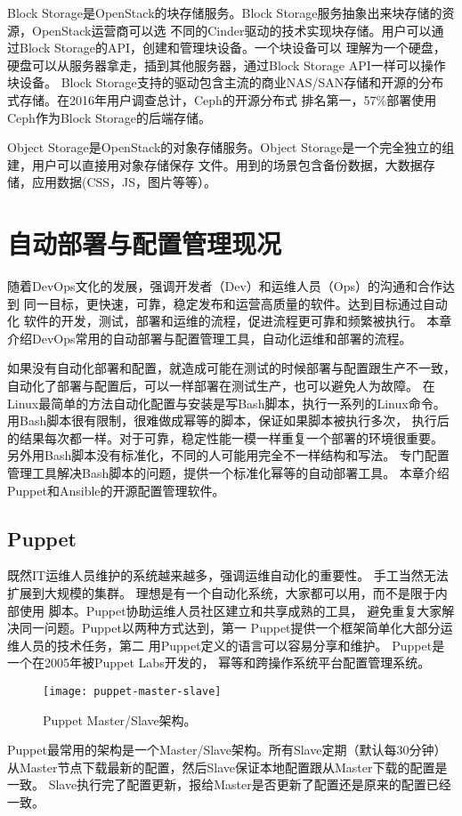Block Storage是OpenStack的块存储服务。Block Storage服务抽象出来块存储的资源，OpenStack运营商可以选
不同的Cinder驱动的技术实现块存储。用户可以通过Block Storage的API，创建和管理块设备。一个块设备可以
理解为一个硬盘，硬盘可以从服务器拿走，插到其他服务器，通过Block Storage API一样可以操作块设备。
Block Storage支持的驱动包含主流的商业NAS/SAN存储和开源的分布式存储。在2016年用户调查总计，Ceph的开源分布式
排名第一，57\%部署使用Ceph作为Block Storage的后端存储。

Object Storage是OpenStack的对象存储服务。Object Storage是一个完全独立的组建，用户可以直接用对象存储保存
文件。用到的场景包含备份数据，大数据存储，应用数据(CSS，JS，图片等等）。



\section{自动部署与配置管理现况}
\label{subsec:automated_deployment}
随着DevOps文化的发展，强调开发者（Dev）和运维人员（Ops）的沟通和合作达到
同一目标，更快速，可靠，稳定发布和运营高质量的软件。达到目标通过自动化
软件的开发，测试，部署和运维的流程，促进流程更可靠和频繁被执行。
本章介绍DevOps常用的自动部署与配置管理工具，自动化运维和部署的流程。

如果没有自动化部署和配置，就造成可能在测试的时候部署与配置跟生产不一致，
自动化了部署与配置后，可以一样部署在测试生产，也可以避免人为故障。
在Linux最简单的方法自动化配置与安装是写Bash脚本，执行一系列的Linux命令。
用Bash脚本很有限制，很难做成幂等的脚本，保证如果脚本被执行多次，
执行后的结果每次都一样。对于可靠，稳定性能一模一样重复一个部署的环境很重要。
另外用Bash脚本没有标准化，不同的人可能用完全不一样结构和写法。
专门配置管理工具解决Bash脚本的问题，提供一个标准化幂等的自动部署工具。
本章介绍Puppet和Ansible的开源配置管理软件。


\subsection{Puppet}
既然IT运维人员维护的系统越来越多，强调运维自动化的重要性。
手工当然无法扩展到大规模的集群。
理想是有一个自动化系统，大家都可以用，而不是限于内部使用
脚本。Puppet协助运维人员社区建立和共享成熟的工具，
避免重复大家解决同一问题。Puppet以两种方式达到，第一
Puppet提供一个框架简单化大部分运维人员的技术任务，第二
用Puppet定义的语言可以容易分享和维护。
Puppet是一个在2005年被Puppet Labs开发的，
幂等和跨操作系统平台配置管理系统。\cite{puppet_docs}

\begin{wrapfigure}{r}{0.40\textwidth}
  \centering
    \texttt{[image: puppet-master-slave]}
    \caption{Puppet Master/Slave架构。\cite{puppet_docs}}
  \label{fig:puppet-master-slave}
\end{wrapfigure}
Puppet最常用的架构是一个Master/Slave架构。所有Slave定期（默认每30分钟）
从Master节点下载最新的配置，然后Slave保证本地配置跟从Master下载的配置是一致。
Slave执行完了配置更新，报给Master是否更新了配置还是原来的配置已经一致。

